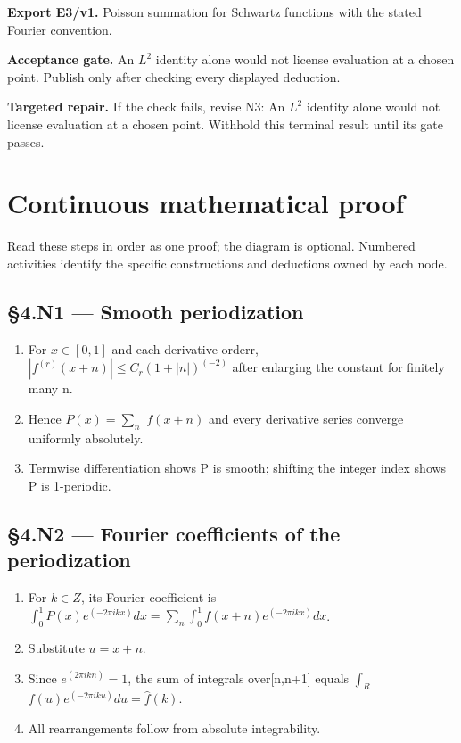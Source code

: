 \documentclass[preprint,12pt,aps,pra,showkeys,amsmath,amssymb,superscriptaddress,floatfix]{revtex4-2}
\theoremstyle{definition}
\theoremstyle{remark}
\newcommand{\field}[2]{\par\smallskip\noindent\textbf{#1.} #2\par}
\begin{document}
\field{Export E3/v1}{Poisson summation for Schwartz functions with the stated Fourier
convention.}

\field{Acceptance gate}{An \(L^{2}\) identity alone would not license evaluation at a chosen
point. Publish only after checking every displayed deduction.}

\field{Targeted repair}{If the check fails, revise N3: An \(L^{2}\) identity alone would not
license evaluation at a chosen point. Withhold this terminal result
until its gate passes.}

\endgroup\clearpage\section{Continuous mathematical proof}\label{sec:proof}

Read these steps in order as one proof; the diagram is optional.
Numbered activities identify the specific constructions and deductions
owned by each node.

\subsection{§4.N1 --- Smooth
periodization}\label{n1-smooth-periodization}

\begin{enumerate}
\def\labelenumi{\arabic{enumi}.}
\item
  For \(x\in [0,1]\) and each derivative orderr,
  \(|f^{(r)}(x+n)|\le C_r(1+|n|)^{(-2)}\) after enlarging the constant
  for finitely many n.
\item
  Hence \(P(x)=\sum _n\) \(f(x+n)\) and every derivative series converge
  uniformly absolutely.
\item
  Termwise differentiation shows P is smooth; shifting the integer index
  shows P is 1-periodic.
\end{enumerate}

\subsection{§4.N2 --- Fourier coefficients of the
periodization}\label{n2-fourier-coefficients-of-the-periodization}

\begin{enumerate}
\def\labelenumi{\arabic{enumi}.}
\item
  For \(k\in Z\), its Fourier coefficient is
  \(\int _{0}^{1}P(x)e^{(-2\pi ikx)}dx=\sum _n\int _{0}^{1}f(x+n)e^{(-2\pi ikx)}dx\).
\item
  Substitute \(u=x+n\).
\item
  Since \(e^{(2\pi ikn)}=1\), the sum of integrals over{[}n,n+1{]}
  equals \(\int _R\) \(f(u)e^{(-2\pi iku)}du=\widehat f(k)\).
\item
  All rearrangements follow from absolute integrability.
\end{enumerate}
\end{document}
